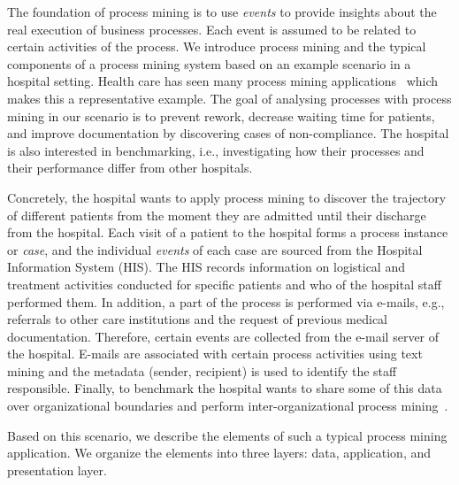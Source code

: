 \documentclass[manuscript]{acmart}
\begin{document}
The foundation of process mining is to use \textit{events} to provide insights about the real execution of business processes. Each event is assumed to be related to certain activities of the process. We introduce process mining and the typical components of a process mining system based on an example scenario in a hospital setting. Health care has seen many process mining applications~\cite{DBLP:journals/tmis/PartingtonWSOK15,Rojas.2016} which makes this a representative example. The goal of analysing processes with process mining in our scenario is to prevent rework, decrease waiting time for patients, and improve documentation by discovering cases of non-compliance. The hospital is also interested in benchmarking, i.e., investigating how their processes and their performance differ from other hospitals.

Concretely, the hospital wants to apply process mining to discover the trajectory of different patients from the moment they are admitted until their discharge from the hospital. Each visit of a patient to the hospital forms a process instance or \emph{case}, and the individual \emph{events} of each case are sourced from the Hospital Information System (HIS). The HIS records information on logistical and treatment activities conducted for specific patients and who of the hospital staff performed them. In addition, a part of the process is performed via e-mails, e.g., referrals to other care institutions and the request of previous medical documentation. Therefore, certain events are collected from the e-mail server of the hospital. E-mails are associated with certain process activities using text mining and the metadata (sender, recipient) is used to identify the staff responsible. Finally, to benchmark the hospital wants to share some of this data over organizational boundaries and perform inter-organizational process mining~\cite{SCHULZ2004109,ZENG20131280}. 

Based on this scenario, we describe the elements of such a typical process mining application. We organize the elements into three layers: data, application, and presentation layer.
\end{document}
